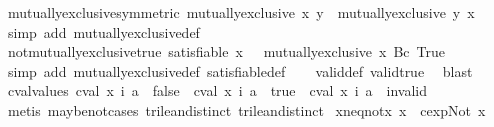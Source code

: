\begin{isabellebody}
{\isafoldproof}%
%
\isadelimproof
\isanewline
%
\endisadelimproof
\isanewline
{}\isamarkupfalse%
\ mutually{\isacharunderscore}exclusive{\isacharunderscore}symmetric{\isacharcolon}\ {\isachardoublequoteopen}mutually{\isacharunderscore}exclusive\ x\ y\ {\isasymLongrightarrow}\ mutually{\isacharunderscore}exclusive\ y\ x{\isachardoublequoteclose}\isanewline
%
\isadelimproof
\ \ %
\endisadelimproof
%
\isatagproof
{}\isamarkupfalse%
\ {\isacharparenleft}simp\ add{\isacharcolon}\ mutually{\isacharunderscore}exclusive{\isacharunderscore}def{\isacharparenright}%
\endisatagproof
{\isafoldproof}%
%
\isadelimproof
\isanewline
%
\endisadelimproof
\isanewline
{}\isamarkupfalse%
\ not{\isacharunderscore}mutually{\isacharunderscore}exclusive{\isacharunderscore}true{\isacharcolon}\ {\isachardoublequoteopen}satisfiable\ x\ {\isacharequal}\ {\isacharparenleft}{\isasymnot}\ mutually{\isacharunderscore}exclusive\ x\ {\isacharparenleft}Bc\ True{\isacharparenright}{\isacharparenright}{\isachardoublequoteclose}\isanewline
%
\isadelimproof
\ \ %
\endisadelimproof
%
\isatagproof
{}\isamarkupfalse%
\ {\isacharparenleft}simp\ add{\isacharcolon}\ mutually{\isacharunderscore}exclusive{\isacharunderscore}def\ satisfiable{\isacharunderscore}def{\isacharparenright}\isanewline
\ \ \isamarkupfalse%
\ valid{\isacharunderscore}def\ valid{\isacharunderscore}true\ \isamarkupfalse%
\ blast%
\endisatagproof
{\isafoldproof}%
%
\isadelimproof
\isanewline
%
\endisadelimproof
\isanewline
{}\isamarkupfalse%
\ cval{\isacharunderscore}values{\isacharcolon}\ {\isachardoublequoteopen}{\isacharparenleft}cval\ x\ i\ a\ {\isasymnoteq}\ false{\isacharparenright}\ {\isacharequal}\ {\isacharparenleft}cval\ x\ i\ a\ {\isacharequal}\ true\ {\isasymor}\ cval\ x\ i\ a\ {\isacharequal}\ invalid{\isacharparenright}{\isachardoublequoteclose}\isanewline
%
\isadelimproof
\ \ %
\endisadelimproof
%
\isatagproof
{}\isamarkupfalse%
\ {\isacharparenleft}metis\ maybe{\isacharunderscore}not{\isachardot}cases\ trilean{\isachardot}distinct{\isacharparenleft}{}{\isacharparenright}\ trilean{\isachardot}distinct{\isacharparenleft}{}{\isacharparenright}{\isacharparenright}%
\endisatagproof
{\isafoldproof}%
%
\isadelimproof
\isanewline
%
\endisadelimproof
\isanewline
{}\isamarkupfalse%
\ x{\isacharunderscore}neq{\isacharunderscore}not{\isacharunderscore}x{\isacharcolon}\ {\isachardoublequoteopen}x\ {\isasymnoteq}\ cexp{\isachardot}Not\ x{\isachardoublequoteclose}\isanewline

\end{isabellebody}
